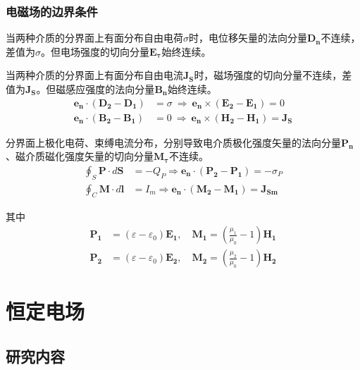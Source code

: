 \documentclass[withoutpreface,bwprint]{cumcmthesis} %
\begin{document}
\subsubsection{电磁场的边界条件}
当两种介质的分界面上有面分布自由电荷$\sigma$时，电位移矢量的法向分量$\boldsymbol{D_n}$不连续，差值为$\sigma$。但电场强度的切向分量$\boldsymbol{E_\tau}$始终连续。

当两种介质的分界面上有面分布自由电流$\boldsymbol{J_S}$时，磁场强度的切向分量不连续，差值为$\boldsymbol{J_S}$。但磁感应强度的法向分量$\boldsymbol{B_n}$始终连续。
\begin{align}
    \boldsymbol{e_n}\cdot (\boldsymbol{D_2} - \boldsymbol{D_1}) &= \sigma \ \Longrightarrow \ \boldsymbol{e_n}\times (\boldsymbol{E_2} - \boldsymbol{E_1}) = 0\\
    \boldsymbol{e_n}\cdot (\boldsymbol{B_2} - \boldsymbol{B_1}) &= 0 \ \Longrightarrow \ \boldsymbol{e_n}\times (\boldsymbol{H_2} - \boldsymbol{H_1}) = \boldsymbol{J_S}
\end{align}

分界面上极化电荷、束缚电流分布，分别导致电介质极化强度矢量的法向分量$\boldsymbol{P_n}$、磁介质磁化强度矢量的切向分量$\boldsymbol{M_\tau}$不连续。
\begin{align}
    \oint_S \boldsymbol{P}\cdot d\boldsymbol{S} &= -Q_P \Longrightarrow \boldsymbol{e_n}\cdot (\boldsymbol{P_2}-\boldsymbol{P_1}) = -\sigma_P \\
    \oint_C \boldsymbol{M}\cdot d\boldsymbol{l} &= I_m \Longrightarrow \boldsymbol{e_n}\cdot (\boldsymbol{M_2}-\boldsymbol{M_1}) = \boldsymbol{J_{Sm}}
\end{align}

其中
\begin{align}
    \boldsymbol{P_1} &= (\varepsilon - \varepsilon_0)\boldsymbol{E_1}, \quad \boldsymbol{M_1} = (\frac{\mu_1}{\mu_0}-1) \boldsymbol{H_1}\\
    \boldsymbol{P_2} &= (\varepsilon - \varepsilon_0)\boldsymbol{E_2}, \quad \boldsymbol{M_2} = (\frac{\mu_2}{\mu_0}-1) \boldsymbol{H_2}
\end{align}

\newpage
\section{恒定电场}

\subsection{研究内容}
\end{document}

